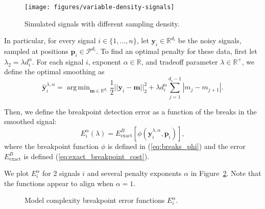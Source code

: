 \documentclass{jsfds} %
\newcommand{\fig}[3][H]{
  \begin{figure}[#1]
    \hskip -1cm
    
    \caption{#3}
    \label{fig:#2}
  \end{figure}
}
\DeclareMathOperator*{\argmin}{arg\,min}
\newcommand{\RR}{\mathbb{R}}
\begin{document}
\begin{figure}[h]
  \centering
  \texttt{[image: figures/variable-density-signals]}
  \caption{Simulated signals with different
  sampling density.}
  \label{fig:variable-density-signals-flsa}
\end{figure}

\newpage

In particular, for every signal $i\in\{1,\dots,n\}$, let
$\mathbf y_i\in\RR^{d_i}$ be the noisy signals, sampled at positions
$\mathbf p_i\in\mathcal P^{d_i}$. To find an optimal penalty for these data,
first let $\lambda_2 = \lambda d_i^\alpha$. For each signal $i$,
exponent $\alpha\in\RR$, and tradeoff parameter $\lambda\in\RR^+$, we
define the optimal smoothing as
\begin{equation}
  \label{eq:flsa_lambda}
  \mathbf{\hat y}^{\lambda,\alpha}_i = 
\argmin_{\mathbf m\in\RR^{d_i}} 
\frac 1 2 ||\mathbf y_i-\mathbf m||_2^2
+\lambda d_i^\alpha \sum_{j=1}^{d_i-1} |m_j - m_{j+1}|.
\end{equation}

Then, we define the breakpoint detection error as a function of the
breaks in the smoothed signal:
\begin{equation}
  \label{eq:flsa_e_i_alpha}
  E_i^\alpha(\lambda) = 
E^B_{\text{exact}}
\left[
\phi\left(
\mathbf{\hat y}^{\lambda,\alpha}_i, \mathbf p_i
\right)
\right],
\end{equation}
where the breakpoint function $\phi$ is defined in
(\ref{eq:breaks_phi}) and the error $E_{\text{exact}}^B$ is defined
(\ref{eq:exact_breakpoint_cost}).

We plot $E_i^\alpha$ for 2 signals $i$ and several penalty exponents
$\alpha$ in Figure~\ref{fig:variable-density-berr-flsa}. Note that the
functions appear to align when $\alpha=1$.

\fig{variable-density-berr-flsa}{Model complexity breakpoint error
  functions $E_i^\alpha$.}

\newpage
\end{document}
